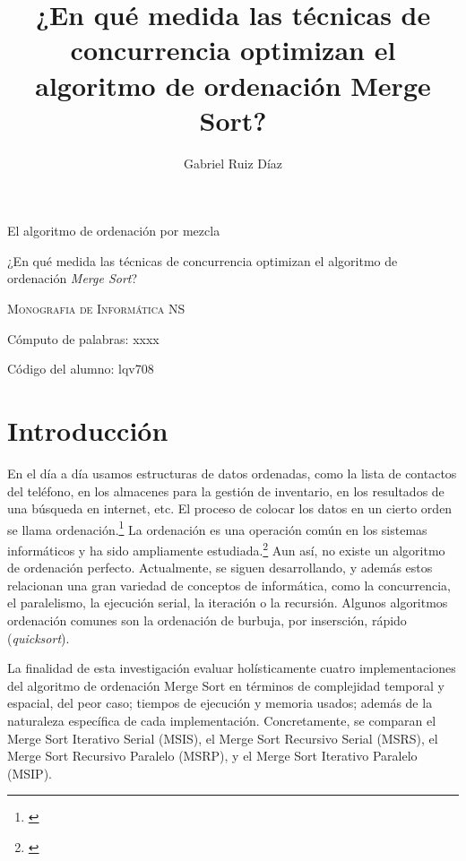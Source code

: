 \documentclass[titlepage]{article}
\title{¿En qué medida las técnicas de concurrencia optimizan el algoritmo de ordenación Merge Sort?}
\author{Gabriel Ruiz Díaz}
\date{}
\begin{document}
	
	
\begin{titlepage}
\centering
{\hfill}
\vspace{3cm}

{\Huge El algoritmo de ordenación por mezcla\par}
\vspace{2cm}
{\LARGE ¿En qué medida las técnicas de concurrencia optimizan el algoritmo de ordenación \textit{Merge Sort}? \par}
\vspace{1cm}
{\scshape\large Monografia de Informática NS \par}
\vspace{8cm}


{\Large Cómputo de palabras: xxxx \par}
{\Large Código del alumno: lqv708 \par}
\end{titlepage}

\newpage
\tableofcontents

\newpage
\section{Introducción}
En el día a día usamos estructuras de datos ordenadas, como la lista de contactos del teléfono, en los almacenes para la gestión de inventario, en los resultados de una búsqueda en internet, etc. El proceso de colocar los datos en un cierto orden se llama ordenación.\footnote{\cite{knuth-1997}} La ordenación es una operación común en los sistemas informáticos y ha sido ampliamente estudiada.\footnote{\cite{McMillan-2007}} Aun así, no existe un algoritmo de ordenación perfecto. Actualmente, se siguen desarrollando, y además estos relacionan una gran variedad de conceptos de informática, como la concurrencia, el paralelismo, la ejecución serial, la iteración o la recursión.
Algunos algoritmos ordenación comunes son la ordenación de burbuja, por insersción, rápido (\textit{quicksort}).

La finalidad de esta investigación evaluar holísticamente cuatro implementaciones del algoritmo de ordenación Merge Sort en términos de complejidad temporal y espacial, del peor caso; tiempos de ejecución y memoria usados; además de la naturaleza específica de cada implementación. Concretamente, se comparan el Merge Sort Iterativo Serial (MSIS), el Merge Sort Recursivo Serial (MSRS), el Merge Sort Recursivo Paralelo (MSRP), y el Merge Sort Iterativo Paralelo (MSIP).
\end{document}

